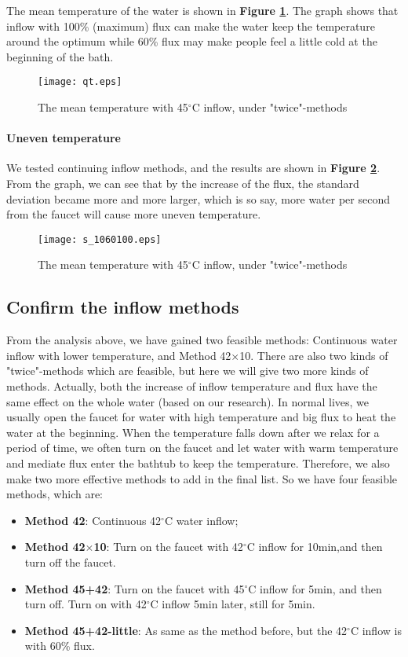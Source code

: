 \documentclass[12pt]{article}
\begin{document}
The mean temperature of the water is shown in \textbf{Figure \ref{qt}}. The graph shows that inflow
with 100\% (maximum) flux can make the water keep the temperature around the optimum while 60\% flux
may make people feel a little cold at the beginning of the bath.
\begin{figure}[!htbp]
\small
\centering
\texttt{[image: qt.eps]}
\caption{The mean temperature with 45$^\circ$C inflow, under "twice"-methods}\label{qt}
\end{figure}

\paragraph{Uneven temperature}
We tested continuing inflow methods, and the results are shown in \textbf{Figure \ref{s3}}. From the
graph, we can see that by the increase of the flux, the standard deviation became more and more
larger, which is so say, more water per second from the faucet will cause more uneven temperature.
\begin{figure}[!htbp]
    \small
    \centering
    \texttt{[image: s\_1060100.eps]}
    \caption{The mean temperature with 45$^\circ$C inflow, under "twice"-methods}\label{s3}
\end{figure}

\subsection{Confirm the inflow methods}
From the analysis above, we have gained two feasible methods: Continuous water inflow with lower
temperature, and Method 42$\times$10. There are also two kinds of "twice"-methods which are
feasible, but here we will give two more kinds of methods. Actually, both the increase of inflow
temperature and flux have the same effect on the whole water (based on our research). In normal
lives, we usually open the faucet for water with high temperature and big flux to heat the water at
the beginning. When the temperature falls down after we relax for a period of time, we often turn on
the faucet and let water with warm temperature and mediate flux enter the bathtub to keep the
temperature. Therefore, we also make two more effective methods to add in the final list. So we have
four feasible methods, which are:
\begin{itemize}
    \item \textbf{Method 42}: Continuous 42$^\circ$C water inflow;
    \item \textbf{Method 42$\times$10}: Turn on the faucet with 42$^\circ$C inflow for 10min,and
    then turn off the faucet.
    \item \textbf{Method 45+42}: Turn on the faucet with 45$^\circ$C inflow for 5min, and then turn
    off. Turn on with 42$^\circ$C inflow 5min later, still for 5min.
    \item \textbf{Method 45+42-little}: As same as the method before, but the 42$^\circ$C inflow is
    with 60\% flux.
\end{itemize}
\end{document}
